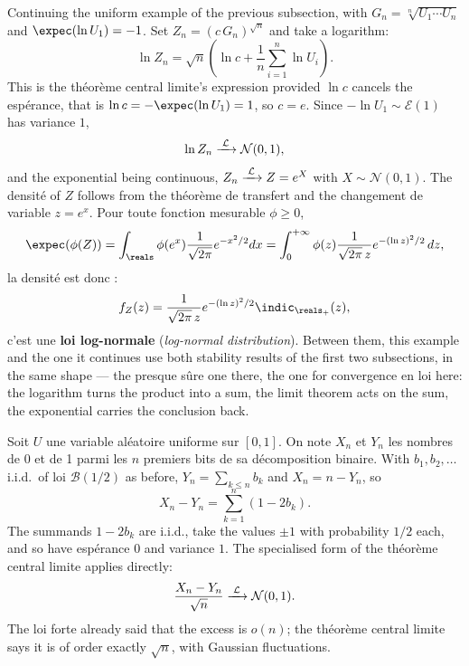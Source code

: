 \begin{example}
  Continuing the uniform example of the previous subsection, with
  $G_{n} = \sqrt[n]{U_{1}\cdots U_{n}}$ and $\expec(\ln U_{1}) = -1$. Set
  $Z_{n} = (c\,G_{n})^{\sqrt{n}}$ and take a logarithm:
  \[
    \ln Z_{n} = \sqrt{n}\left(\ln c + \frac{1}{n}\sum_{i=1}^{n} \ln U_{i}\right) .
  \]
  This is the théorème central limite's expression provided $\ln c$ cancels the
  espérance, that is $\ln c = -\expec(\ln U_{1}) = 1$, so $c = e$. Since
  $-\ln U_{1} \sim \mathcal{E}(1)$ has variance $1$,
  \[
    \ln Z_{n} \xrightarrow{\;\mathcal{L}\;} \mathcal{N}(0,1) ,
  \]
  and the exponential being continuous, $Z_{n} \xrightarrow{\;\mathcal{L}\;} Z = e^{X}$ with
  $X \sim \mathcal{N}(0,1)$. The densité of $Z$ follows from the théorème de
  transfert and the changement de variable $z = e^{x}$. Pour toute fonction
  mesurable $\phi \geq 0$,
  \[
    \expec(\phi(Z)) = \int_{\reals} \phi(e^{x})
      \frac{1}{\sqrt{2\pi}} e^{-x^{2}/2} dx
    = \int_{0}^{+\infty} \phi(z) \frac{1}{\sqrt{2\pi}\,z}
      e^{-(\ln z)^{2}/2} \, dz ,
  \]
  la densité est donc :
  \[
    f_{Z}(z) = \frac{1}{\sqrt{2\pi}\,z} e^{-(\ln z)^{2}/2}
      \indic_{\reals_{+}}(z) ,
  \]
  c'est une \textbf{loi log-normale} (\textit{log-normal distribution}). Between
  them, this example and the one it continues use both stability results of the
  first two subsections, in the same shape --- the presque sûre one there, the
  one for convergence en loi here:
  the logarithm turns the product into a sum, the limit theorem acts on the sum,
  the exponential carries the conclusion back.
\end{example}

\begin{example}
  Soit $U$ une variable aléatoire uniforme sur $[0,1]$. On note $X_{n}$ et
  $Y_{n}$ les nombres de 0 et de 1 parmi les $n$ premiers bits de sa
  décomposition binaire. With
  $b_{1}, b_{2}, \dots$ i.i.d.\ of loi $\mathcal{B}(1/2)$ as before,
  $Y_{n} = \sum_{k \leq n} b_{k}$ and $X_{n} = n - Y_{n}$, so
  \[
    X_{n} - Y_{n} = \sum_{k=1}^{n} (1 - 2b_{k}) .
  \]
  The summands $1 - 2b_{k}$ are i.i.d., take the values $\pm 1$ with probability
  $1/2$ each, and so have espérance $0$ and variance $1$. The specialised form
  of the théorème central limite applies directly:
  \[
    \frac{X_{n} - Y_{n}}{\sqrt{n}} \xrightarrow{\;\mathcal{L}\;} \mathcal{N}(0,1) .
  \]
  The loi forte already said that the excess is $o(n)$; the théorème central
  limite says it is of order exactly $\sqrt{n}$, with Gaussian fluctuations.
\end{example}

